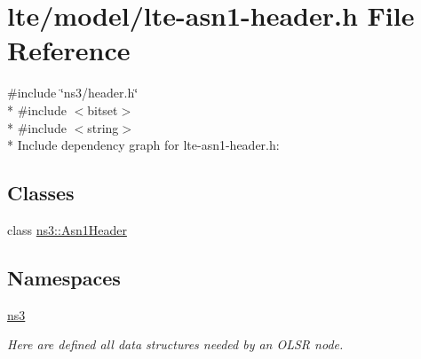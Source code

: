 \hypertarget{lte-asn1-header_8h}{}\section{lte/model/lte-\/asn1-\/header.h File Reference}
\label{lte-asn1-header_8h}
{\ttfamily \#include \char`\"{}ns3/header.\+h\char`\"{}}\\*
{\ttfamily \#include $<$bitset$>$}\\*
{\ttfamily \#include $<$string$>$}\\*
Include dependency graph for lte-\/asn1-\/header.h\+:
\subsection*{Classes}
\begin{DoxyCompactItemize}
\item 
class \hyperlink{classns3_1_1Asn1Header}{ns3\+::\+Asn1\+Header}
\end{DoxyCompactItemize}
\subsection*{Namespaces}
\begin{DoxyCompactItemize}
\item 
 \hyperlink{namespacens3}{ns3}
\begin{DoxyCompactList}\small\item\em Here are defined all data structures needed by an O\+L\+SR node. \end{DoxyCompactList}\end{DoxyCompactItemize}
